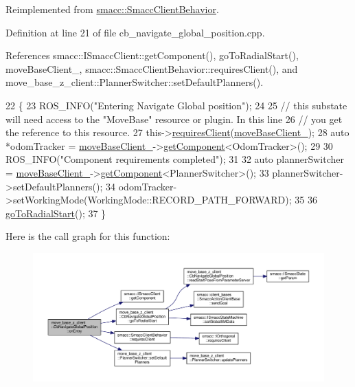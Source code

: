 Reimplemented from \hyperlink{classsmacc_1_1SmaccClientBehavior_a7962382f93987c720ad432fef55b123f}{smacc\+::\+Smacc\+Client\+Behavior}.



Definition at line 21 of file cb\+\_\+navigate\+\_\+global\+\_\+position.\+cpp.



References smacc\+::\+I\+Smacc\+Client\+::get\+Component(), go\+To\+Radial\+Start(), move\+Base\+Client\+\_\+, smacc\+::\+Smacc\+Client\+Behavior\+::requires\+Client(), and move\+\_\+base\+\_\+z\+\_\+client\+::\+Planner\+Switcher\+::set\+Default\+Planners().


\begin{DoxyCode}
22 \{
23     ROS\_INFO(\textcolor{stringliteral}{"Entering Navigate Global position"});
24 
25     \textcolor{comment}{// this substate will need access to the "MoveBase" resource or plugin. In this line}
26     \textcolor{comment}{// you get the reference to this resource.}
27     this->\hyperlink{classsmacc_1_1SmaccClientBehavior_a917f001e763a1059af337bf4e164f542}{requiresClient}(\hyperlink{classmove__base__z__client_1_1CbNavigateGlobalPosition_a418cb1a461d6f28cb34908b739298657}{moveBaseClient\_});
28     \textcolor{keyword}{auto} *odomTracker = \hyperlink{classmove__base__z__client_1_1CbNavigateGlobalPosition_a418cb1a461d6f28cb34908b739298657}{moveBaseClient\_}->\hyperlink{classsmacc_1_1ISmaccClient_adef78db601749ca63c19e74a27cb88cc}{getComponent}<OdomTracker>();
29 
30     ROS\_INFO(\textcolor{stringliteral}{"Component requirements completed"});
31 
32     \textcolor{keyword}{auto} plannerSwitcher = \hyperlink{classmove__base__z__client_1_1CbNavigateGlobalPosition_a418cb1a461d6f28cb34908b739298657}{moveBaseClient\_}->\hyperlink{classsmacc_1_1ISmaccClient_adef78db601749ca63c19e74a27cb88cc}{getComponent}<PlannerSwitcher>();
33     plannerSwitcher->setDefaultPlanners();
34     odomTracker->setWorkingMode(WorkingMode::RECORD\_PATH\_FORWARD);
35 
36     \hyperlink{classmove__base__z__client_1_1CbNavigateGlobalPosition_abc8b9437cce7b86ec7acb07c463c90e5}{goToRadialStart}();
37 \}
\end{DoxyCode}


Here is the call graph for this function\+:\nopagebreak
\begin{figure}[H]
\begin{center}
\leavevmode
\includegraphics[width=350pt]{classmove__base__z__client_1_1CbNavigateGlobalPosition_a79f11334456f350b488f7d9a204ea3c5_cgraph}
\end{center}
\end{figure}



